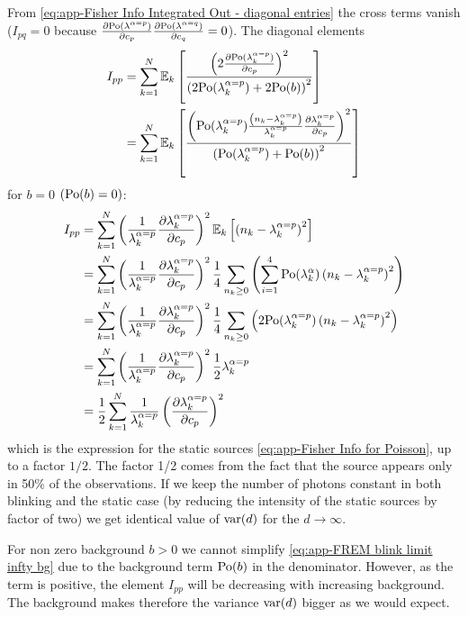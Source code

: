 From \autoref{eq:app-Fisher Info Integrated Out - diagonal entries} the cross terms vanish ($I_{pq}=0$ because $\frac{\partial\mathrm{Po}(\lambda^{\alpha=p})}{\partial c_p}\frac{\partial\mathrm{Po}(\lambda^{\alpha=q})}{\partial c_{q}}=0$). The diagonal elements 
%
\begin{alignat}{3}
	I_{pp} 
	& =\sum_{k=1}^N\mathbb{E}_k\left[\frac{\left(2\frac{\partial\mathrm{Po}(\lambda_k^{\alpha=p})}{\partial c_p}\right)^2}{\left(2\mathrm{Po}(\lambda_k^{\alpha=p})+2\mathrm{Po}(b)\right)^2}\right] \\
 	& =\sum_{k=1}^N\mathbb{E}_k\left[\frac{\left(\mathrm{Po}(\lambda_k^{\alpha=p})\frac{\left(n_k-\lambda_k^{\alpha=p}\right)}{\lambda_k^{\alpha=p}}\frac{\partial\lambda_k^{\alpha=p}}{\partial c_p}\right)^2}{\left(\mathrm{Po}(\lambda_k^{\alpha=p})+\mathrm{Po}(b)\right)^2}\right]\label{eq:app-FREM blink limit infty bg}
\end{alignat}
%
for $b=0$ $\left(\mathrm{Po}(b)=0\right)$:
%
\begin{alignat}{2}
	I_{pp} 
	 &=\sum_{k=1}^N\left(\frac{1}{\lambda_k^{\alpha=p}}\frac{\partial\lambda_k^{\alpha=p}}{\partial c_p}\right)^2\mathbb{E}_k\left[\left(n_k-\lambda_k^{\alpha=p}\right)^2\right]\nonumber\\
 	& =\sum_{k=1}^N\left(\frac{1}{\lambda_k^{\alpha=p}}\frac{\partial\lambda_k^{\alpha=p}}{\partial c_p}\right)^2\frac{1}{4}\sum_{n_k\geq0}\left(\sum_{i=1}^4\mathrm{Po}(\lambda_k^\alpha)\left(n_k-\lambda_k^{\alpha=p}\right)^2\right)\nonumber\\
 	& =\sum_{k=1}^N\left(\frac{1}{\lambda_k^{\alpha=p}}\frac{\partial\lambda_k^{\alpha=p}}{\partial c_p}\right)^2\frac{1}{4}\sum_{n_k\geq0}\left(2\mathrm{Po}(\lambda_k^{\alpha=p})\left(n_k-\lambda_k^{\alpha=p}\right)^2\right)\nonumber\\
 	& =\sum_{k=1}^N\left(\frac{1}{\lambda_k^{\alpha=p}}\frac{\partial\lambda_k^{\alpha=p}}{\partial c_p}\right)^2\frac{1}{2}\lambda_k^{\alpha=p}\nonumber\\
 	& =\frac{1}{2}\sum_{k=1}^N\frac{1}{\lambda_k^{\alpha=p}}\left(\frac{\partial\lambda_k^{\alpha=p}}{\partial c_p}\right)^2	\label{eq:app-FREM blink lim infty b=0}
\end{alignat}
%
which is the expression for the static sources \autoref{eq:app-Fisher Info for Poisson}, up to a factor $1/2$. The factor 1/2 comes from the fact that the source appears only in 50\% of the observations. If we keep the number of photons constant in both blinking and the static case (by reducing the intensity of the static sources by factor of two) we get identical value of $\mathrm{var}(d)$ for the $d\rightarrow\infty$. 

For non zero background $b>0$ we cannot simplify \autoref{eq:app-FREM blink limit infty bg} due to the background term $\mathrm{Po}(b)$ in the denominator. However, as the term is positive, the element $I_{pp}$ will be decreasing with increasing background. The background makes therefore the variance $\mathrm{var}(d)$ bigger as we would expect.

